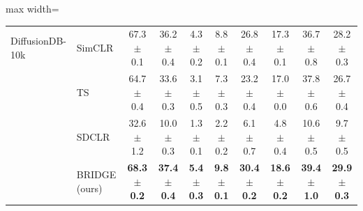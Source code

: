 \begin{table}[t]
\begin{adjustbox}{max width=\textwidth}
\begin{tabular}{l l c c c c c c c c}
\midrule
DiffusionDB-10k & SimCLR & 67.3 {\scriptsize$\pm$ 0.1} & 36.2 {\scriptsize$\pm$ 0.4} & 4.3 {\scriptsize$\pm$ 0.2} & 8.8 {\scriptsize$\pm$ 0.1} & 26.8 {\scriptsize$\pm$ 0.4} & 17.3 {\scriptsize$\pm$ 0.1} & 36.7 {\scriptsize$\pm$ 0.8} & 28.2 {\scriptsize$\pm$ 0.3} \\
 & TS & 64.7 {\scriptsize$\pm$ 0.4} & 33.6 {\scriptsize$\pm$ 0.3} & 3.1 {\scriptsize$\pm$ 0.5} & 7.3 {\scriptsize$\pm$ 0.3} & 23.2 {\scriptsize$\pm$ 0.4} & 17.0 {\scriptsize$\pm$ 0.0} & 37.8 {\scriptsize$\pm$ 0.6} & 26.7 {\scriptsize$\pm$ 0.4} \\
 & SDCLR & 32.6 {\scriptsize$\pm$ 1.2} & 10.0 {\scriptsize$\pm$ 0.3} & 1.3 {\scriptsize$\pm$ 0.1} & 2.2 {\scriptsize$\pm$ 0.2} & 6.1 {\scriptsize$\pm$ 0.7} & 4.8 {\scriptsize$\pm$ 0.4} & 10.6 {\scriptsize$\pm$ 0.5} & 9.7 {\scriptsize$\pm$ 0.5} \\
\rowcolor{blue!10} & BRIDGE (ours) & \textbf{68.3 {\scriptsize$\pm$ 0.2}} & \textbf{37.4 {\scriptsize$\pm$ 0.4}} & \textbf{5.4 {\scriptsize$\pm$ 0.3}} & \textbf{9.8 {\scriptsize$\pm$ 0.1}} & \textbf{30.4 {\scriptsize$\pm$ 0.2}} & \textbf{18.6 {\scriptsize$\pm$ 0.2}} & \textbf{39.4 {\scriptsize$\pm$ 1.0}} & \textbf{29.9 {\scriptsize$\pm$ 0.3}} \\
\bottomrule
\end{tabular}
\end{adjustbox}
\end{table}
